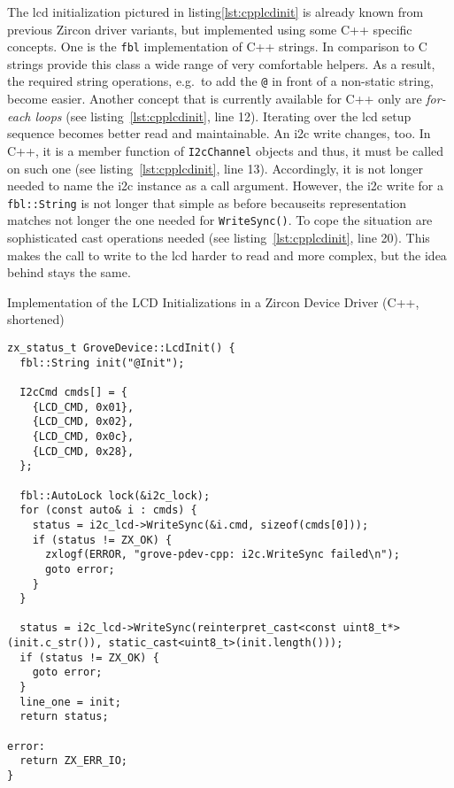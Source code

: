 The \ac{lcd} initialization pictured in listing\ref{lst:cpplcdinit} is already known from previous Zircon driver variants, but implemented using some C++ specific concepts.
One is the \texttt{fbl} implementation of C++ strings.
In comparison to C strings provide this class a wide range of very comfortable helpers.
As a result, the required string operations, e.g.\ to add the \texttt{@} in front of a non-static string, become easier.
Another concept that is currently available for C++ only are \textit{for-each loops} (see listing~\ref{lst:cpplcdinit}, line 12).
Iterating over the \ac{lcd} setup sequence becomes better read and maintainable.
An \ac{i2c} write changes, too.
In C++, it is a member function of \texttt{I2cChannel} objects and thus, it must be called on such one (see listing~\ref{lst:cpplcdinit}, line 13).
Accordingly, it is not longer needed to name the \ac{i2c} instance as a call argument.
However, the \ac{i2c} write for a \texttt{fbl::String} is not longer that simple as before becauseits representation matches not longer the one needed for \texttt{WriteSync()}.
To cope the situation are sophisticated cast operations needed (see listing~\ref{lst:cpplcdinit}, line 20).
This makes the call to write to the \ac{lcd} harder to read and more complex, but the idea behind stays the same.

\begin{listing} [H]
    \caption{Implementation of the LCD Initializations in a Zircon Device Driver (C++, shortened)}
\label{lst:cpplcdinit}
\begin{verbatim}
zx_status_t GroveDevice::LcdInit() {
  fbl::String init("@Init");

  I2cCmd cmds[] = {
    {LCD_CMD, 0x01},
    {LCD_CMD, 0x02},
    {LCD_CMD, 0x0c},
    {LCD_CMD, 0x28},
  };

  fbl::AutoLock lock(&i2c_lock);
  for (const auto& i : cmds) {
    status = i2c_lcd->WriteSync(&i.cmd, sizeof(cmds[0]));
    if (status != ZX_OK) {
      zxlogf(ERROR, "grove-pdev-cpp: i2c.WriteSync failed\n");
      goto error;
    }
  }

  status = i2c_lcd->WriteSync(reinterpret_cast<const uint8_t*>(init.c_str()), static_cast<uint8_t>(init.length()));
  if (status != ZX_OK) {
    goto error;
  }
  line_one = init;
  return status;

error:
  return ZX_ERR_IO;
}
\end{verbatim}
\end{listing}

